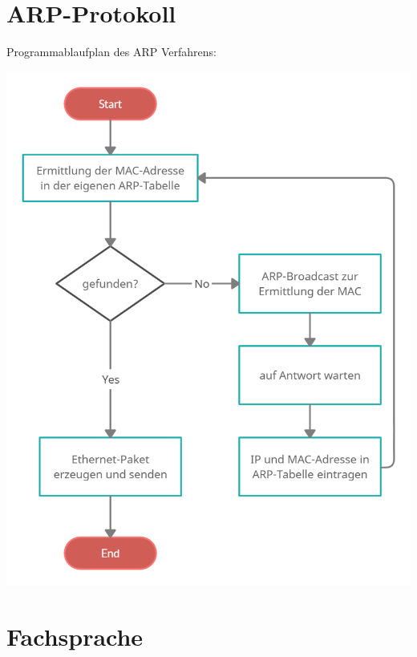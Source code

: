 \documentclass[12pt,a4paper]{article}
\begin{document}
\section{ARP-Protokoll}
Programmablaufplan des ARP Verfahrens:
\begin{center}
\includegraphics[scale=0.3]{Bilder/ARP-Protokoll PAP.png}
\end{center}
\section{Fachsprache}
\end{document}
